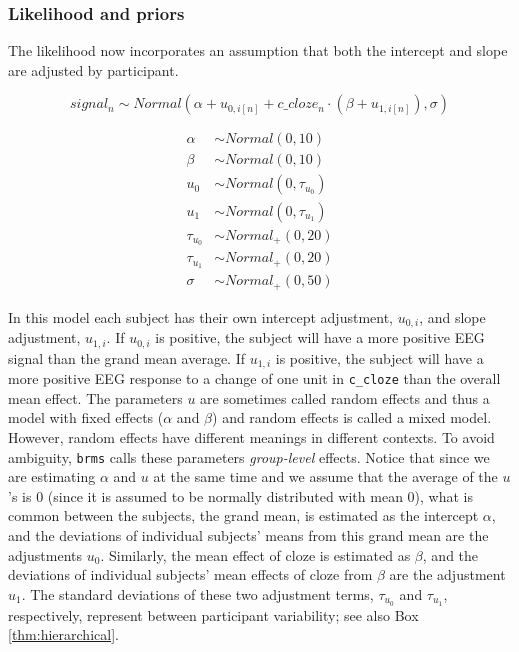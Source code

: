 \documentclass[12pt,]{krantz}
\theoremstyle{definition}
\theoremstyle{definition}
\theoremstyle{definition}
\theoremstyle{remark}
\begin{document}
\hypertarget{likelihood-and-priors-3}{%
\subsubsection{Likelihood and priors}\label{likelihood-and-priors-3}}

The likelihood now incorporates an assumption that both the intercept and slope are adjusted by participant.

\begin{equation}
  signal_n \sim Normal(\alpha + u_{0,i[n]} + c\_cloze_n \cdot (\beta+ u_{1,i[n]}),\sigma)
 \end{equation}

\begin{equation}
 \begin{aligned}
 \alpha &\sim Normal(0,10)\\
 \beta  &\sim Normal(0,10)\\
 u_0 &\sim Normal(0,\tau_{u_0})\\
 u_1 &\sim Normal(0,\tau_{u_1})\\
 \tau_{u_0} &\sim Normal_+(0,20) \\
 \tau_{u_1} &\sim Normal_+(0,20) \\
 \sigma  &\sim Normal_+(0,50)
 \end{aligned}
 \end{equation}

In this model each subject has their own intercept adjustment, \(u_{0,i}\), and slope adjustment, \(u_{1,i}\). If \(u_{0,i}\) is positive, the subject will have a more positive EEG signal than the grand mean average. If \(u_{1,i}\) is positive, the subject will have a more positive EEG response to a change of one unit in \texttt{c\_cloze} than the overall mean effect. The parameters \(u\) are sometimes called random effects and thus a model with fixed effects (\(\alpha\) and \(\beta\)) and random effects is called a mixed model. However, random effects have different meanings in different contexts. To avoid ambiguity, \texttt{brms} calls these parameters \emph{group-level} effects. Notice that since we are estimating \(\alpha\) and \(u\) at the same time and we assume that the average of the \(u\)'s is 0 (since it is assumed to be normally distributed with mean 0), what is common between the subjects, the grand mean, is estimated as the intercept \(\alpha\), and the deviations of individual subjects' means from this grand mean are the adjustments \(u_0\). Similarly, the mean effect of cloze is estimated as \(\beta\), and the deviations of individual subjects' mean effects of cloze from \(\beta\) are the adjustment \(u_1\). The standard deviations of these two adjustment terms, \(\tau_{u_0}\) and \(\tau_{u_1}\), respectively, represent between participant variability; see also Box \ref{thm:hierarchical}.
\end{document}
